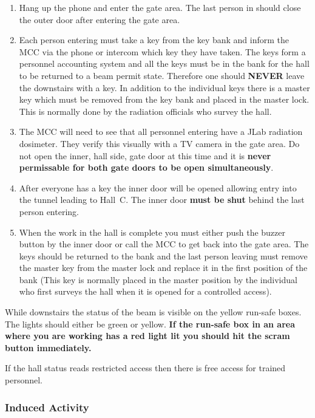 {\begin{enumerate}
\item{Hang up the phone and enter the gate area. The last
person in should close the outer door after entering the gate area.}

\item{Each person entering must take a key from the key bank
and inform the MCC via the phone or intercom which key they have taken.
The keys form a personnel accounting system and all the keys must
be in the bank for the hall to be returned to a beam permit state.
Therefore one should {\bf NEVER} leave the downstairs with a key.
In addition to the individual keys there is a master key which
must be removed from the key bank and placed in the master lock. This
is normally done by the radiation officials who survey the hall.}

\item{The MCC will need to see that all personnel entering have
a JLab radiation dosimeter. They verify this visually with a TV camera in the gate area.
Do not open the inner, hall side, gate door at this time and
it is {\bf never permissable for both gate doors to be open 
simultaneously}.}

\item{After everyone has a key the inner door will be opened
allowing entry into the tunnel leading to Hall~C.
The inner door {\bf must be shut} behind the last person entering.}

\item{When the work in the hall is complete you must
either push the buzzer button by the inner door or call the
MCC to get back into the gate area.
The keys should be returned to the bank and the last person leaving
must remove the master key from
the master lock and replace it in the first position of the
bank (This key is normally placed in the master position by the individual who
first surveys the hall when it is opened for a controlled access).}

\end{enumerate}

While downstairs the status of the beam is visible on the yellow
run-safe boxes. The lights should either be green or yellow.
{\bf If the run-safe box in an area where you are working has a red
light lit you should hit the scram button immediately.}

If the hall status reads restricted access then there is free
access for trained personnel.

\subsubsection{Induced Activity}

}
